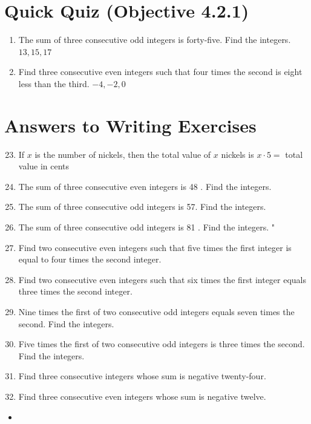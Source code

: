 \documentclass{ximera}
\begin{document}
\section*{Quick Quiz (Objective 4.2.1)}
\begin{enumerate}
  \item The sum of three consecutive odd integers is forty-five. Find the integers. $13,15,17$
  \item Find three consecutive even integers such that four times the second is eight less than the third. $-4,-2,0$
\end{enumerate}

\section*{Answers to Writing Exercises}
\begin{enumerate}
  \setcounter{enumi}{22}
  \item If $x$ is the number of nickels, then the total value of $x$ nickels is $x \cdot 5=$ total value in cents
  \item The sum of three consecutive even integers is 48 . Find the integers.
  \item The sum of three consecutive odd integers is 57. Find the integers.
  \item The sum of three consecutive odd integers is 81 . Find the integers. "
  \item Find two consecutive even integers such that five times the first integer is equal to four times the second integer.
  \item Find two consecutive even integers such that six times the first integer equals three times the second integer.
  \item Nine times the first of two consecutive odd integers equals seven times the second. Find the integers.
  \item Five times the first of two consecutive odd integers is three times the second. Find the integers.
  \item Find three consecutive integers whose sum is negative twenty-four.
  \item Find three consecutive even integers whose sum is negative twelve.
\end{enumerate}

\begin{itemize}
  \item 
\end{itemize}
\end{document}
